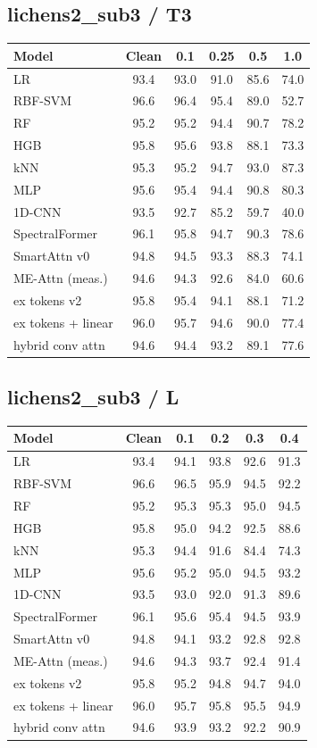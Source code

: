 \subsection*{lichens2\_sub3 / T3}
\small
\begin{tabular}{lccccc}
\toprule
Model & Clean & 0.1 & 0.25 & 0.5 & 1.0 \\
\midrule
LR & 93.4 & 93.0 & 91.0 & 85.6 & 74.0 \\
RBF-SVM & 96.6 & 96.4 & 95.4 & 89.0 & 52.7 \\
RF & 95.2 & 95.2 & 94.4 & 90.7 & 78.2 \\
HGB & 95.8 & 95.6 & 93.8 & 88.1 & 73.3 \\
kNN & 95.3 & 95.2 & 94.7 & 93.0 & 87.3 \\
MLP & 95.6 & 95.4 & 94.4 & 90.8 & 80.3 \\
1D-CNN & 93.5 & 92.7 & 85.2 & 59.7 & 40.0 \\
SpectralFormer & 96.1 & 95.8 & 94.7 & 90.3 & 78.6 \\
SmartAttn v0 & 94.8 & 94.5 & 93.3 & 88.3 & 74.1 \\
ME-Attn (meas.) & 94.6 & 94.3 & 92.6 & 84.0 & 60.6 \\
ex tokens v2 & 95.8 & 95.4 & 94.1 & 88.1 & 71.2 \\
ex tokens + linear & 96.0 & 95.7 & 94.6 & 90.0 & 77.4 \\
hybrid conv attn & 94.6 & 94.4 & 93.2 & 89.1 & 77.6 \\
\bottomrule
\end{tabular}

\subsection*{lichens2\_sub3 / L}
\small
\begin{tabular}{lccccc}
\toprule
Model & Clean & 0.1 & 0.2 & 0.3 & 0.4 \\
\midrule
LR & 93.4 & 94.1 & 93.8 & 92.6 & 91.3 \\
RBF-SVM & 96.6 & 96.5 & 95.9 & 94.5 & 92.2 \\
RF & 95.2 & 95.3 & 95.3 & 95.0 & 94.5 \\
HGB & 95.8 & 95.0 & 94.2 & 92.5 & 88.6 \\
kNN & 95.3 & 94.4 & 91.6 & 84.4 & 74.3 \\
MLP & 95.6 & 95.2 & 95.0 & 94.5 & 93.2 \\
1D-CNN & 93.5 & 93.0 & 92.0 & 91.3 & 89.6 \\
SpectralFormer & 96.1 & 95.6 & 95.4 & 94.5 & 93.9 \\
SmartAttn v0 & 94.8 & 94.1 & 93.2 & 92.8 & 92.8 \\
ME-Attn (meas.) & 94.6 & 94.3 & 93.7 & 92.4 & 91.4 \\
ex tokens v2 & 95.8 & 95.2 & 94.8 & 94.7 & 94.0 \\
ex tokens + linear & 96.0 & 95.7 & 95.8 & 95.5 & 94.9 \\
hybrid conv attn & 94.6 & 93.9 & 93.2 & 92.2 & 90.9 \\
\bottomrule
\end{tabular}

